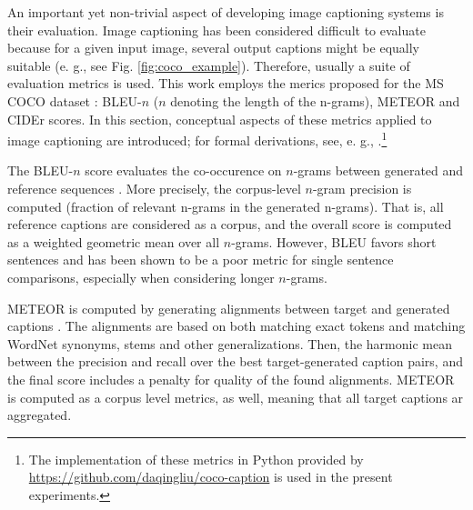 An important yet non-trivial aspect of developing image captioning systems is their evaluation. Image captioning has been considered difficult to evaluate because for a given input image, several output captions might be equally suitable (e. g., see Fig. \ref{fig:coco_example}). Therefore, usually a suite of evaluation metrics is used. This work employs the merics proposed for the MS COCO dataset \parencite{chen2015microsoft}: BLEU-$n$ ($n$ denoting the length of the n-grams), METEOR and CIDEr scores. In this section, conceptual aspects of these metrics applied to image captioning are introduced; for formal derivations, see, e. g., \cite{chen2015microsoft}.\footnote{The implementation of these metrics in Python provided by \url{https://github.com/daqingliu/coco-caption} is used in the present experiments.}

The BLEU-$n$ score evaluates the co-occurence on $n$-grams between generated and reference sequences \parencite{papineni2002bleu}. More precisely, the corpus-level $n$-gram precision is computed (fraction of relevant n-grams in the generated n-grams). That is, all reference captions are considered as a corpus, and the overall score is computed as a weighted geometric mean over all $n$-grams. However, BLEU favors short sentences and has been shown to be a poor metric for single sentence comparisons, especially when considering longer $n$-grams.


METEOR is computed by generating alignments between target and generated captions \parencite{banerjee2005meteor}. The alignments are based on both matching exact tokens and matching WordNet synonyms, stems and other generalizations. Then, the harmonic mean between the precision and recall over the best target-generated caption pairs, and the final score includes a penalty for quality of the found alignments. METEOR is computed as a corpus level metrics, as well, meaning that all target captions ar aggregated.
 
